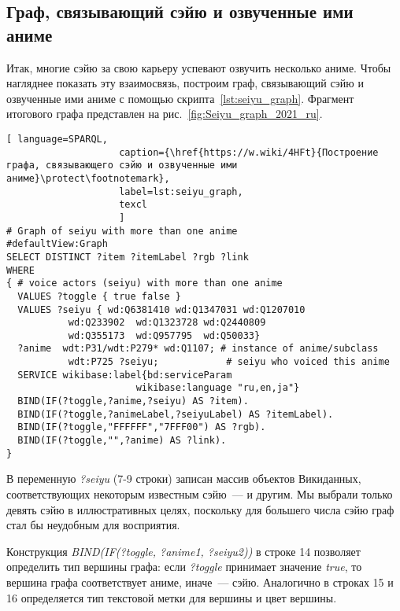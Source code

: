 \subsection{Граф, связывающий сэйю и озвученные ими аниме}

Итак, многие сэйю за свою карьеру успевают озвучить несколько аниме. Чтобы нагляднее показать эту взаимосвязь, построим граф, связывающий сэйю и озвученные ими аниме с помощью скрипта~\protect\ref{lst:seiyu_graph}. Фрагмент итогового графа представлен на рис.~\ref{fig:Seiyu_graph_2021_ru}. 

\lstset{numbers=left, firstnumber=1, frame=single}
\begin{lstlisting}[ language=SPARQL, 
                    caption={\href{https://w.wiki/4HFt}{Построение графа, связывающего сэйю и озвученные ими аниме}\protect\footnotemark},
                    label=lst:seiyu_graph,
                    texcl 
                    ]
# Graph of seiyu with more than one anime
#defaultView:Graph
SELECT DISTINCT ?item ?itemLabel ?rgb ?link
WHERE
{ # voice actors (seiyu) with more than one anime
  VALUES ?toggle { true false }
  VALUES ?seiyu { wd:Q6381410 wd:Q1347031 wd:Q1207010 
           wd:Q233902  wd:Q1323728 wd:Q2440809 
           wd:Q355173  wd:Q957795  wd:Q50033}
  ?anime  wdt:P31/wdt:P279* wd:Q1107; # instance of anime/subclass
           wdt:P725 ?seiyu;            # seiyu who voiced this anime 
  SERVICE wikibase:label{bd:serviceParam
					   wikibase:language "ru,en,ja"}
  BIND(IF(?toggle,?anime,?seiyu) AS ?item).
  BIND(IF(?toggle,?animeLabel,?seiyuLabel) AS ?itemLabel).
  BIND(IF(?toggle,"FFFFFF","7FFF00") AS ?rgb).
  BIND(IF(?toggle,"",?anime) AS ?link).
}
\end{lstlisting}%
\lstset{numbers=none}

В переменную \emph{?seiyu} (\num{7}-\num{9} строки) записан массив объектов Викиданных, соответствующих некоторым известным сэйю~---  и другим. Мы выбрали только девять сэйю в иллюстративных целях, поскольку для большего числа сэйю граф стал бы неудобным для восприятия.

Конструкция \emph{BIND(IF(?toggle, ?anime1, ?seiyu2))} в строке \num{14} позволяет определить тип вершины графа: если \emph{?toggle} принимает значение \emph{true}, то вершина графа соответствует аниме, иначе~--- сэйю. Аналогично в строках \num{15} и \num{16} определяется тип текстовой метки для вершины и цвет вершины.

